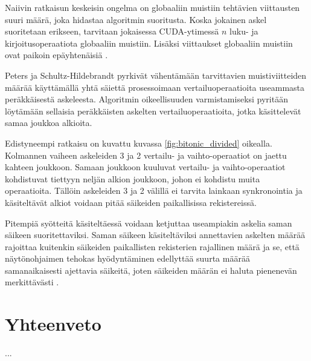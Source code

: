 \documentclass[a4paper,11pt]{article}
\begin{document}
Naiivin ratkaisun keskeisin ongelma on globaaliin muistiin tehtävien viittausten suuri määrä, joka hidastaa algoritmin suoritusta. Koska jokainen askel suoritetaan erikseen, tarvitaan jokaisessa CUDA-ytimessä $n$ luku- ja kirjoitusoperaatiota globaaliin muistiin. Lisäksi viittaukset globaaliin muistiin ovat paikoin epäyhtenäisiä \cite{peters2012gems}.

Peters ja Schultz-Hildebrandt \cite{peters2012gems} pyrkivät vähentämään tarvittavien muistiviitteiden määrää käyttämällä yhtä säiettä prosessoimaan vertailuoperaatioita useammasta peräkkäisestä askeleesta. Algoritmin oikeellisuuden varmistamiseksi pyritään löytämään sellaisia peräkkäisten askelten vertailuoperaatioita, jotka käsittelevät samaa joukkoa alkioita.

Edistyneempi ratkaisu on kuvattu kuvassa \ref{fig:bitonic_divided} oikealla. Kolmannen vaiheen askeleiden 3 ja 2 vertailu- ja vaihto-operaatiot on jaettu kahteen joukkoon. Samaan joukkoon kuuluvat vertailu- ja vaihto-operaatiot kohdistuvat tiettyyn neljän alkion joukkoon, johon ei kohdistu muita operaatioita. Tällöin askeleiden 3 ja 2 välillä ei tarvita lainkaan synkronointia ja käsiteltävät alkiot voidaan pitää säikeiden paikallisissa rekistereissä.

Pitempiä syötteitä käsiteltäessä voidaan ketjuttaa useampiakin askelia saman säikeen suoritettaviksi. Saman säikeen käsiteltäviksi annettavien askelten määrää rajoittaa kuitenkin säikeiden paikallisten rekisterien rajallinen määrä ja se, että näytönohjaimen tehokas hyödyntäminen edellyttää suurta määrää samanaikaisesti ajettavia säikeitä, joten säikeiden määrän ei haluta pienenevän merkittävästi \cite{peters2012gems}.

\section{Yhteenveto}

...

\printbibliography
\end{document}
